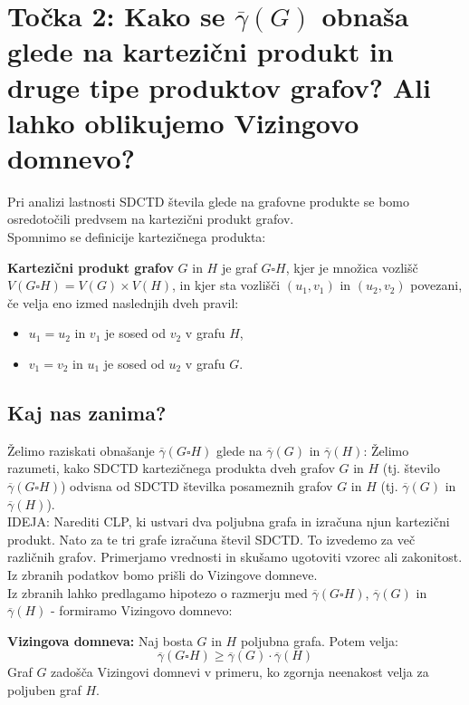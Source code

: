 \documentclass[a4paper, 12pt]{article}
\begin{document}
\section*{Točka 2: Kako se $\overline\gamma(G)$ obnaša glede na kartezični produkt in druge tipe produktov grafov? Ali lahko oblikujemo Vizingovo domnevo? }

Pri analizi lastnosti SDCTD števila glede na grafovne produkte se bomo osredotočili predvsem na kartezični produkt grafov. \\
Spomnimo se definicije kartezičnega produkta: 

\textbf{Kartezični produkt grafov}  \( G \) in \( H \) je graf \( G \square H \), kjer je množica vozlišč \( V(G \square H) = V(G) \times V(H) \), in kjer sta vozlišči \( (u_1, v_1) \) in \( (u_2, v_2) \) povezani, če velja eno izmed naslednjih dveh pravil:

\begin{itemize}
    \item \( u_1 = u_2 \) in \( v_1 \) je sosed od \( v_2 \) v grafu \( H \),
    \item \( v_1 = v_2 \) in \( u_1 \) je sosed od \( u_2 \) v grafu \( G \).
\end{itemize}

\subsection*{Kaj nas zanima?}

Želimo raziskati obnašanje \( \overline{\gamma}(G \square H) \) glede na \( \overline{\gamma}(G) \) in \( \overline{\gamma}(H) \): Želimo razumeti, kako SDCTD kartezičnega produkta dveh grafov \( G \) in \( H \) (tj. število \( \overline{\gamma}(G \square H) \)) odvisna od SDCTD številka posameznih grafov \( G \) in \( H \) (tj. \( \overline{\gamma}(G) \) in \( \overline{\gamma}(H) \)). \\

IDEJA: Narediti CLP, ki ustvari dva poljubna grafa in izračuna njun kartezični produkt. Nato za te tri grafe izračuna števil SDCTD. To izvedemo za več različnih grafov. Primerjamo vrednosti in skušamo ugotoviti vzorec ali zakonitost. Iz zbranih podatkov bomo prišli do Vizingove domneve. \\


Iz zbranih lahko predlagamo hipotezo o razmerju med \( \overline{\gamma}(G \square H) \), \( \overline{\gamma}(G) \) in \( \overline{\gamma}(H) \) - formiramo Vizingovo domnevo:

\textbf{\noindet Vizingova domneva:} Naj bosta \( G \) in \( H \) poljubna grafa. Potem velja:
\[
\overline{\gamma}(G \square H) \geq \overline{\gamma}(G) \cdot \overline{\gamma}(H)
\]
Graf \( G \) zadošča Vizingovi domnevi v primeru, ko zgornja neenakost velja za poljuben graf \( H \).
\end{document}
